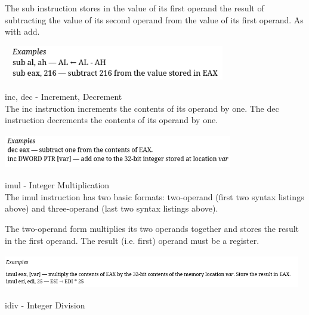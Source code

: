 \documentclass[12pt]{extarticle}
\begin{document}
 The sub instruction stores in the value of its first operand the result of subtracting the value of its second operand from the value of its first operand. As with add.

 \begin{center}

    \includegraphics[width=10cm, height=1.5cm]{sub}
    
 \end{center}

 inc, dec - Increment, Decrement \\ 

 The inc instruction increments the contents of its operand by one. The dec instruction decrements the contents of its operand by one.

 \begin{center}

    \includegraphics[width=10cm, height=1.5cm]{inc-dec}
    
 \end{center}

 imul - Integer Multiplication \\

 The imul instruction has two basic formats: two-operand (first two syntax listings above) and three-operand (last two syntax listings above).

The two-operand form multiplies its two operands together and stores the result in the first operand. The result (i.e. first) operand must be a register.  \\


 \begin{center}

    \includegraphics[width=13cm, height=1.5cm]{imul}
    
 \end{center}

 idiv - Integer Division \\ 
\end{document}
